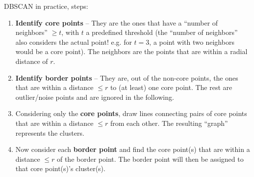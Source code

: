     DBSCAN in practice, steps:
    \begin{enumerate}
        \item \textbf{Identify core points} -- They are the ones that have a ``number of neighbors'' $\geq t$, with $t$ a predefined threshold (the ``number of neighbors'' also considers the actual point! e.g. for $t=3$, a point with two neighbors would be a core point). The neighbors are the points that are within a radial distance of $r$.
        \item \textbf{Identify border points} -- They are, out of the non-core points, the ones that are within a distance $\leq r$ to (at least) one core point. The rest are outlier/noise points and are ignored in the following.
        \item Considering only the \textbf{core points}, draw lines connecting pairs of core points that are within a distance $\leq r$ from each other. The resulting ``graph'' represents the clusters.
        \item Now consider each \textbf{border point} and find the core point(s) that are within a distance $\leq r$ of the border point. The border point will then be assigned to that core point(s)'s cluster(s).
    \end{enumerate}

